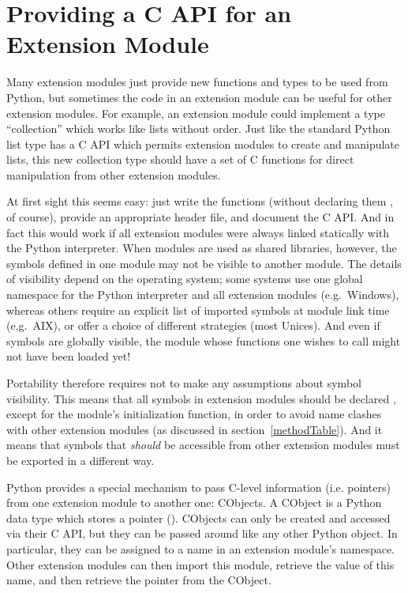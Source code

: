 \documentclass{manual}
\begin{document}
\section{Providing a C API for an Extension Module
         \label{using-cobjects}}

Many extension modules just provide new functions and types to be
used from Python, but sometimes the code in an extension module can
be useful for other extension modules. For example, an extension
module could implement a type ``collection'' which works like lists
without order. Just like the standard Python list type has a C API
which permits extension modules to create and manipulate lists, this
new collection type should have a set of C functions for direct
manipulation from other extension modules.

At first sight this seems easy: just write the functions (without
declaring them , of course), provide an appropriate
header file, and document the C API. And in fact this would work if
all extension modules were always linked statically with the Python
interpreter. When modules are used as shared libraries, however, the
symbols defined in one module may not be visible to another module.
The details of visibility depend on the operating system; some systems
use one global namespace for the Python interpreter and all extension
modules (e.g.\ Windows), whereas others require an explicit list of
imported symbols at module link time (e.g.\ AIX), or offer a choice of
different strategies (most Unices). And even if symbols are globally
visible, the module whose functions one wishes to call might not have
been loaded yet!

Portability therefore requires not to make any assumptions about
symbol visibility. This means that all symbols in extension modules
should be declared , except for the module's
initialization function, in order to avoid name clashes with other
extension modules (as discussed in section~\ref{methodTable}). And it
means that symbols that \emph{should} be accessible from other
extension modules must be exported in a different way.

Python provides a special mechanism to pass C-level information (i.e.
pointers) from one extension module to another one: CObjects.
A CObject is a Python data type which stores a pointer ().  CObjects can only be created and accessed via their C API, but
they can be passed around like any other Python object. In particular, 
they can be assigned to a name in an extension module's namespace.
Other extension modules can then import this module, retrieve the
value of this name, and then retrieve the pointer from the CObject.
\end{document}
